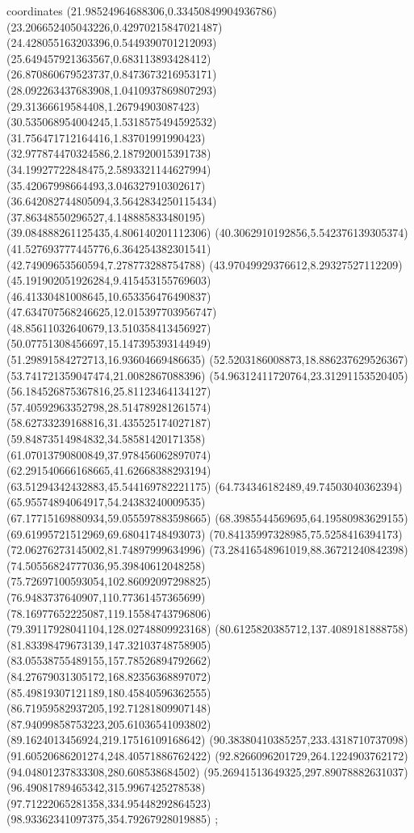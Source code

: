 coordinates {%
(21.98524964688306,0.33450849904936786)
(23.206652405043226,0.42970215847021487)
(24.428055163203396,0.5449390701212093)
(25.649457921363567,0.683113893428412)
(26.870860679523737,0.8473673216953171)
(28.092263437683908,1.0410937869807293)
(29.31366619584408,1.26794903087423)
(30.535068954004245,1.5318575494592532)
(31.756471712164416,1.83701991990423)
(32.977874470324586,2.187920015391738)
(34.19927722848475,2.5893321144627994)
(35.42067998664493,3.046327910302617)
(36.642082744805094,3.5642834250115434)
(37.86348550296527,4.148885833480195)
(39.084888261125435,4.806140201112306)
(40.3062910192856,5.542376139305374)
(41.527693777445776,6.364254382301541)
(42.74909653560594,7.278773288754788)
(43.97049929376612,8.29327527112209)
(45.191902051926284,9.415453155769603)
(46.41330481008645,10.653356476490837)
(47.634707568246625,12.015397703956747)
(48.85611032640679,13.510358413456927)
(50.07751308456697,15.147395393144949)
(51.29891584272713,16.93604669486635)
(52.5203186008873,18.886237629526367)
(53.741721359047474,21.0082867088396)
(54.96312411720764,23.31291153520405)
(56.184526875367816,25.81123464134127)
(57.40592963352798,28.514789281261574)
(58.62733239168816,31.435525174027187)
(59.84873514984832,34.58581420171358)
(61.07013790800849,37.978456062897074)
(62.291540666168665,41.62668388293194)
(63.51294342432883,45.544169782221175)
(64.734346182489,49.74503040362394)
(65.95574894064917,54.24383240009535)
(67.17715169880934,59.055597883598665)
(68.3985544569695,64.19580983629155)
(69.61995721512969,69.68041748493073)
(70.84135997328985,75.5258416394173)
(72.06276273145002,81.74897999634996)
(73.28416548961019,88.36721240842398)
(74.50556824777036,95.39840612048258)
(75.72697100593054,102.86092097298825)
(76.9483737640907,110.77361457365699)
(78.16977652225087,119.15584743796806)
(79.39117928041104,128.02748809923168)
(80.6125820385712,137.4089181888758)
(81.83398479673139,147.32103748758905)
(83.05538755489155,157.78526894792662)
(84.27679031305172,168.82356368897072)
(85.49819307121189,180.45840596362555)
(86.71959582937205,192.71281809907148)
(87.94099858753223,205.61036541093802)
(89.1624013456924,219.17516109168642)
(90.38380410385257,233.4318710737098)
(91.60520686201274,248.40571886762422)
(92.8266096201729,264.1224903762172)
(94.04801237833308,280.608538684502)
(95.26941513649325,297.89078882631037)
(96.49081789465342,315.9967425278538)
(97.71222065281358,334.95448292864523)
(98.93362341097375,354.79267928019885)
};
